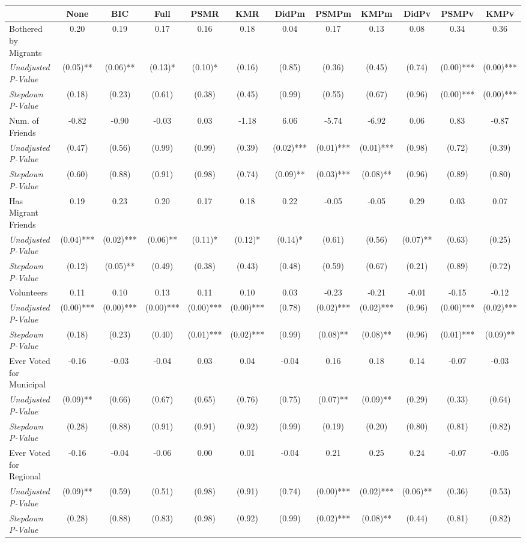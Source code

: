 \begin{tabular}{l c c c c c c c c c c c}
\toprule
 & None & BIC & Full & PSMR & KMR & DidPm & PSMPm & KMPm & DidPv & PSMPv & KMPv \\
\midrule
Bothered by Migrants & 0.20 & 0.19 & 0.17 & 0.16 & 0.18 & 0.04 & 0.17 & 0.13 & 0.08 & 0.34 & 0.36 \\
\quad \textit{Unadjusted P-Value} & (0.05)** & (0.06)** & (0.13)* & (0.10)* & (0.16) & (0.85) & (0.36) & (0.45) & (0.74) & (0.00)*** & (0.00)*** \\
\quad \textit{Stepdown P-Value} & (0.18) & (0.23) & (0.61) & (0.38) & (0.45) & (0.99) & (0.55) & (0.67) & (0.96) & (0.00)*** & (0.00)*** \\
Num. of Friends & -0.82 & -0.90 & -0.03 & 0.03 & -1.18 & 6.06 & -5.74 & -6.92 & 0.06 & 0.83 & -0.87 \\
\quad \textit{Unadjusted P-Value} & (0.47) & (0.56) & (0.99) & (0.99) & (0.39) & (0.02)*** & (0.01)*** & (0.01)*** & (0.98) & (0.72) & (0.39) \\
\quad \textit{Stepdown P-Value} & (0.60) & (0.88) & (0.91) & (0.98) & (0.74) & (0.09)** & (0.03)*** & (0.08)** & (0.96) & (0.89) & (0.80) \\
Has Migrant Friends & 0.19 & 0.23 & 0.20 & 0.17 & 0.18 & 0.22 & -0.05 & -0.05 & 0.29 & 0.03 & 0.07 \\
\quad \textit{Unadjusted P-Value} & (0.04)*** & (0.02)*** & (0.06)** & (0.11)* & (0.12)* & (0.14)* & (0.61) & (0.56) & (0.07)** & (0.63) & (0.25) \\
\quad \textit{Stepdown P-Value} & (0.12) & (0.05)** & (0.49) & (0.38) & (0.43) & (0.48) & (0.59) & (0.67) & (0.21) & (0.89) & (0.72) \\
Volunteers & 0.11 & 0.10 & 0.13 & 0.11 & 0.10 & 0.03 & -0.23 & -0.21 & -0.01 & -0.15 & -0.12 \\
\quad \textit{Unadjusted P-Value} & (0.00)*** & (0.00)*** & (0.00)*** & (0.00)*** & (0.00)*** & (0.78) & (0.02)*** & (0.02)*** & (0.96) & (0.00)*** & (0.02)*** \\
\quad \textit{Stepdown P-Value} & (0.18) & (0.23) & (0.40) & (0.01)*** & (0.02)*** & (0.99) & (0.08)** & (0.08)** & (0.96) & (0.01)*** & (0.09)** \\
Ever Voted for Municipal & -0.16 & -0.03 & -0.04 & 0.03 & 0.04 & -0.04 & 0.16 & 0.18 & 0.14 & -0.07 & -0.03 \\
\quad \textit{Unadjusted P-Value} & (0.09)** & (0.66) & (0.67) & (0.65) & (0.76) & (0.75) & (0.07)** & (0.09)** & (0.29) & (0.33) & (0.64) \\
\quad \textit{Stepdown P-Value} & (0.28) & (0.88) & (0.91) & (0.91) & (0.92) & (0.99) & (0.19) & (0.20) & (0.80) & (0.81) & (0.82) \\
Ever Voted for Regional & -0.16 & -0.04 & -0.06 & 0.00 & 0.01 & -0.04 & 0.21 & 0.25 & 0.24 & -0.07 & -0.05 \\
\quad \textit{Unadjusted P-Value} & (0.09)** & (0.59) & (0.51) & (0.98) & (0.91) & (0.74) & (0.00)*** & (0.02)*** & (0.06)** & (0.36) & (0.53) \\
\quad \textit{Stepdown P-Value} & (0.28) & (0.88) & (0.83) & (0.98) & (0.92) & (0.99) & (0.02)*** & (0.08)** & (0.44) & (0.81) & (0.82) \\
\bottomrule
\end{tabular}
